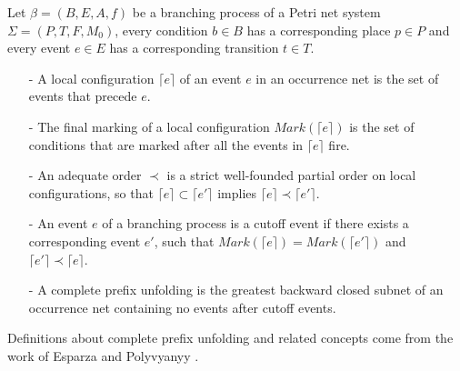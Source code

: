 \documentclass{llncs}
\begin{document}
\begin{definition}\label{def:cpu}
Let $\beta=(B,E,A,f)$ be a branching process of a Petri net system $\Sigma=(P,T,F,M_{0})$, every condition $b\in B$ has a corresponding place $p\in P$ and every event $e\in E$ has a corresponding transition $t\in T$.
	\begin{itemize}
		\item[-] A local configuration $\lceil e\rceil$ of an event $e$ in an occurrence net is the set of events that precede $e$.
		\item[-] The final marking of a local configuration $Mark(\lceil e\rceil)$ is the set of conditions that are marked after all the events in $\lceil e\rceil$ fire.
		\item[-] An adequate order $\prec$ is a strict well-founded partial order on local configurations, so that $\lceil e\rceil\subset\lceil e'\rceil$ implies $\lceil e\rceil\prec\lceil e'\rceil$.
		\item[-] An event $e$ of a branching process is a cutoff event if there exists a corresponding event $e'$, such that $Mark(\lceil e\rceil)=Mark(\lceil e'\rceil)$ and $\lceil e'\rceil\prec\lceil e\rceil$.
		\item[-] A complete prefix unfolding is the greatest backward closed subnet of an occurrence net containing no events after cutoff events.
	\end{itemize}
\end{definition}

Definitions about complete prefix unfolding and related concepts come from the work of Esparza \cite{esparza1996improvement} and Polyvyanyy \cite{polyvyanyy2010structuring}.
\end{document}
